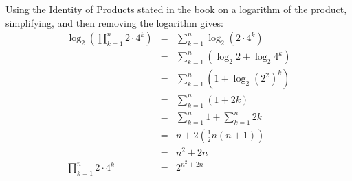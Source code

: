 Using the Identity of Products stated in the book on a logarithm of the product, simplifying, and then removing the logarithm gives:
\begin{eqnarray*}
	\log_2 \left ( \prod_{k=1}^n 2 \cdot 4^k \right ) & = & \sum_{k=1}^n \log_2 \left ( 2 \cdot 4^k \right ) \\
	& = & \sum_{k=1}^n \left ( \log_2 2 + \log_2 4^k \right ) \\
	& = & \sum_{k=1}^n \left ( 1 + \log_2 \left ( 2^2 \right )^k \right ) \\
	& = & \sum_{k=1}^n \left ( 1 + 2k \right ) \\
	& = & \sum_{k=1}^n 1 + \sum_{k=1}^n 2k \\
	& = & n + 2 \left ( \frac{1}{2} n \left ( n+1 \right ) \right ) \\
	& = & n^2 + 2n \\
	\prod_{k=1}^n 2 \cdot 4^k & = & 2^{n^2 + 2n}
\end{eqnarray*}
